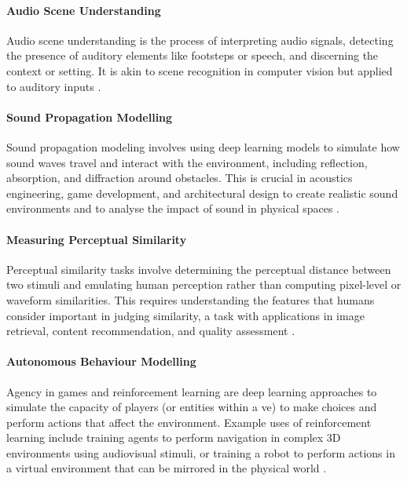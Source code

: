 \paragraph{Audio Scene Understanding}
Audio scene understanding is the process of interpreting audio signals, detecting the presence of auditory elements like footsteps or speech, and discerning the context or setting. It is akin to scene recognition in computer vision but applied to auditory inputs \citep{abesser2020review}.\par
\paragraph{Sound Propagation Modelling}
Sound propagation modeling involves using deep learning models to simulate how sound waves travel and interact with the environment, including reflection, absorption, and diffraction around obstacles. This is crucial in acoustics engineering, game development, and architectural design to create realistic sound environments and to analyse the impact of sound in physical spaces \citep{liu2022sound}.\par
\paragraph{Measuring Perceptual Similarity}
Perceptual similarity tasks involve determining the perceptual distance between two stimuli and emulating human perception rather than computing pixel-level or waveform similarities. This requires understanding the features that humans consider important in judging similarity, a task with applications in image retrieval, content recommendation, and quality assessment \citep{Dolhasz_2020_CVPR}.\par
\paragraph{Autonomous Behaviour Modelling}
Agency in games and reinforcement learning are deep learning approaches to simulate the capacity of players (or entities within a \acrshort{ve}) to make choices and perform actions that affect the environment. Example uses of reinforcement learning include training agents to perform navigation in complex 3D environments using audiovisual stimuli, or training a robot to perform actions in a virtual environment that can be mirrored in the physical world \citep{yannakakis2018artificial, matulis2021robot}.


